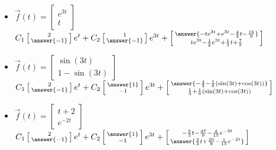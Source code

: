 \documentclass{ximera}
\begin{document}
\begin{exercise}
\begin{itemize}
        \item $\vec{f}(t) = \begin{bmatrix} e^{3t} \\ t \end{bmatrix}$\\
            $C_1\left[\begin{smallmatrix} 2 \\ \answer{-1} \end{smallmatrix}\right]e^{t} + C_2\left[\begin{smallmatrix} 1 \\ \answer{-1} \end{smallmatrix}\right]e^{3t} + \left[\begin{smallmatrix} \answer{-te^{3t} + e^{3t} - \frac{4}{3}t - \frac{16}{9}} \\ te^{3t} - \frac{1}{2}e^{3t} + \frac{1}{3}t + \frac{7}{9} \end{smallmatrix}\right]$
        \item $\vec{f}(t) = \begin{bmatrix} \sin(3t) \\ 1 - \sin(3t) \end{bmatrix}$\\
            $C_1\left[\begin{smallmatrix} 2 \\ \answer{-1} \end{smallmatrix}\right]e^{t} + C_2\left[\begin{smallmatrix} \answer{1} \\ -1 \end{smallmatrix}\right]e^{3t} + \left[\begin{smallmatrix} \answer{-\frac{4}{3} - \frac{1}{6}(\sin(3t) + \cos(3t))} \\ \frac{1}{3} + \frac{1}{6}(\sin(3t) + \cos(3t))\end{smallmatrix}\right]$
        \item $\vec{f}(t) = \begin{bmatrix} t + 2 \\ e^{-2t} \end{bmatrix}$\\
            $C_1\left[\begin{smallmatrix} 2 \\ \answer{-1} \end{smallmatrix}\right]e^{t} + C_2\left[\begin{smallmatrix} \answer{1} \\ -1 \end{smallmatrix}\right]e^{3t} + \left[\begin{smallmatrix} -\frac{5}{3}t - \frac{47}{9} - \frac{4}{15}e^{-2t} \\ \answer{\frac{2}{3}t + \frac{20}{9} - \frac{1}{15}e^{-2t}} \end{smallmatrix}\right]$

\end{itemize}
\end{exercise}
\end{document}

